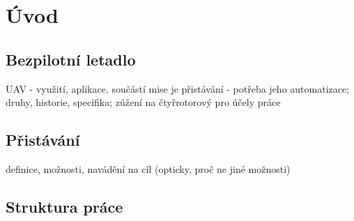 \chapter{Úvod} \label{chap:introduction}




\section{Bezpilotní letadlo}
UAV - využití, aplikace, součástí mise je přistávání - potřeba jeho automatizace; druhy, historie, specifika; zúžení na čtyřrotorový pro účely práce
\section{Přistávání}
definice, možnosti, navádění na cíl (opticky, proč ne jiné možnosti)
\section{Struktura práce}